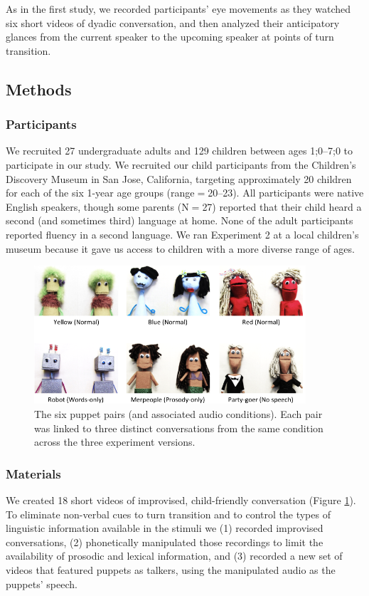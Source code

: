 \documentclass[authoryear, 12pt]{elsarticle}
\begin{document}
As in the first study, we recorded participants' eye movements as they watched six short videos of dyadic conversation, and then analyzed their anticipatory glances from the current speaker to the upcoming speaker at points of turn transition.

\subsection{Methods}
\label{sec:methods2}

\subsubsection{Participants}
We recruited 27 undergraduate adults and 129 children between ages 1;0--7;0 to participate in our study. We recruited our child participants from the Children's Discovery Museum in San Jose, California, targeting approximately 20 children for each of the six 1-year age groups (range$=$20--23). All participants were native English speakers, though some parents (N$=$27) reported that their child heard a second (and sometimes third) language at home. None of the adult participants reported fluency in a second language. We ran Experiment 2 at a local children's museum because it gave us access to children with a more diverse range of ages.

\begin{figure}[t]
\begin{center}
\includegraphics[width=0.9\textwidth]{figures/FIG-EN-stim.png}
\end{center}
\caption{The six puppet pairs (and associated audio conditions). Each pair was linked to three distinct conversations from the same condition across the three experiment versions.}
\label{fig:puppets}
\end{figure}

\subsubsection{Materials}
We created 18 short videos of improvised, child-friendly conversation (Figure \ref{fig:puppets}). To eliminate non-verbal cues to turn transition and to control the types of linguistic information available in the stimuli we (1) recorded improvised conversations, (2) phonetically manipulated those recordings to limit the availability of prosodic and lexical information, and (3) recorded a new set of videos that featured puppets as talkers, using the manipulated audio as the puppets' speech. 
\end{document}

